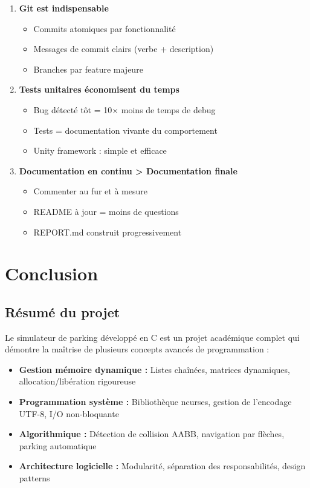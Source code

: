 \documentclass[12pt,a4paper]{article}
\begin{document}
\begin{enumerate}
    \item \textbf{Git est indispensable}
    \begin{itemize}
        \item Commits atomiques par fonctionnalité
        \item Messages de commit clairs (verbe + description)
        \item Branches par feature majeure
    \end{itemize}

    \item \textbf{Tests unitaires économisent du temps}
    \begin{itemize}
        \item Bug détecté tôt = 10× moins de temps de debug
        \item Tests = documentation vivante du comportement
        \item Unity framework : simple et efficace
    \end{itemize}

    \item \textbf{Documentation en continu > Documentation finale}
    \begin{itemize}
        \item Commenter au fur et à mesure
        \item README à jour = moins de questions
        \item REPORT.md construit progressivement
    \end{itemize}
\end{enumerate}


\section{Conclusion}

\subsection{Résumé du projet}

Le simulateur de parking développé en C est un projet académique complet qui démontre la maîtrise de plusieurs concepts avancés de programmation :

\begin{itemize}
    \item \textbf{Gestion mémoire dynamique :} Listes chaînées, matrices dynamiques, allocation/libération rigoureuse
    \item \textbf{Programmation système :} Bibliothèque ncurses, gestion de l'encodage UTF-8, I/O non-bloquante
    \item \textbf{Algorithmique :} Détection de collision AABB, navigation par flèches, parking automatique
    \item \textbf{Architecture logicielle :} Modularité, séparation des responsabilités, design patterns
\end{itemize}
\end{document}
